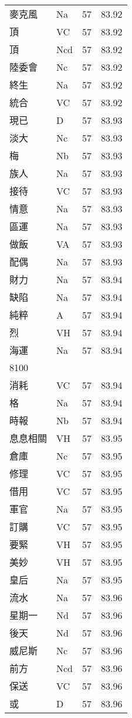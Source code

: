 \documentclass[twocolumn]{book}
\begin{document}
\begin{supertabular}{llrr}
麥克風 & Na & 57 &  83.92\\
頂 & VC & 57 &  83.92\\
頂 & Ncd & 57 &  83.92\\
陸委會 & Nc & 57 &  83.92\\
終生 & Na & 57 &  83.92\\
統合 & VC & 57 &  83.92\\
現已 & D & 57 &  83.93\\
淡大 & Nc & 57 &  83.93\\
梅 & Nb & 57 &  83.93\\
族人 & Na & 57 &  83.93\\
接待 & VC & 57 &  83.93\\
情意 & Na & 57 &  83.93\\
區運 & Na & 57 &  83.93\\
做飯 & VA & 57 &  83.93\\
配偶 & Na & 57 &  83.93\\
財力 & Na & 57 &  83.94\\
缺陷 & Na & 57 &  83.94\\
純粹 & A & 57 &  83.94\\
烈 & VH & 57 &  83.94\\
海運 & Na & 57 &  83.94\\
8100\\
消耗 & VC & 57 &  83.94\\
格 & Na & 57 &  83.94\\
時報 & Nb & 57 &  83.94\\
息息相關 & VH & 57 &  83.95\\
倉庫 & Nc & 57 &  83.95\\
修理 & VC & 57 &  83.95\\
借用 & VC & 57 &  83.95\\
軍官 & Na & 57 &  83.95\\
訂購 & VC & 57 &  83.95\\
要緊 & VH & 57 &  83.95\\
美妙 & VH & 57 &  83.95\\
皇后 & Na & 57 &  83.95\\
流水 & Na & 57 &  83.96\\
星期一 & Nd & 57 &  83.96\\
後天 & Nd & 57 &  83.96\\
威尼斯 & Nc & 57 &  83.96\\
前方 & Ncd & 57 &  83.96\\
保送 & VC & 57 &  83.96\\
或 & D & 57 &  83.96\\

\end{supertabular}
\end{document}
